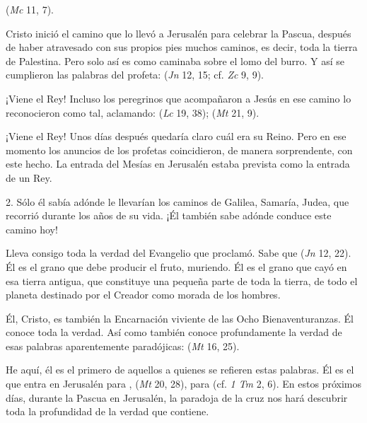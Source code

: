\begin{body}
 (\textit{Mc} 11, 7).

 Cristo inició el camino que lo llevó a Jerusalén para celebrar la Pascua, después de haber atravesado con sus propios pies muchos caminos, es decir, toda la tierra de Palestina. Pero solo así es como caminaba sobre el lomo del burro. Y así se cumplieron las palabras del profeta:  (\textit{Jn} 12, 15; cf. \textit{Zc} 9, 9).

¡Viene el Rey! Incluso los peregrinos que acompañaron a Jesús en ese camino lo reconocieron como tal, aclamando:  (\textit{Lc} 19, 38);  (\textit{Mt} 21, 9).

¡Viene el Rey! Unos días después quedaría claro cuál era su Reino. Pero en ese momento los anuncios de los profetas coincidieron, de manera sorprendente, con este hecho. La entrada del Mesías en Jerusalén estaba prevista como la entrada de un Rey.

2. Sólo él sabía adónde le llevarían los caminos de Galilea, Samaría, Judea, que recorrió durante los años de su vida. ¡Él también sabe adónde conduce este camino hoy!

Lleva consigo toda la verdad del Evangelio que proclamó. Sabe que  (\textit{Jn} 12, 22). Él es el grano que debe producir el fruto, muriendo. Él es el grano que cayó en esa tierra antigua, que constituye una pequeña parte de toda la tierra, de todo el planeta destinado por el Creador como morada de los hombres.

Él, Cristo, es también la Encarnación viviente de las Ocho Bienaventuranzas. Él conoce toda la verdad. Así como también conoce profundamente la verdad de esas palabras aparentemente paradójicas:  (\textit{Mt} 16, 25).

He aquí, él es el primero de aquellos a quienes se refieren estas palabras. Él es el que entra en Jerusalén para ,  (\textit{Mt} 20, 28), para  (cf. \textit{1 Tm} 2, 6). En estos próximos días, durante la Pascua en Jerusalén, la paradoja de la cruz nos hará descubrir toda la profundidad de la verdad que contiene.


\end{body}
